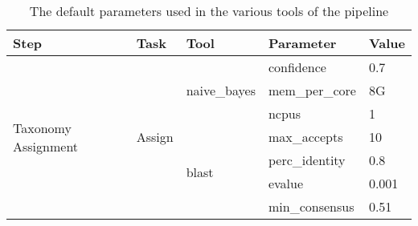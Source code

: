 \begin{table}[H]
\centering
\small
\begin{tabular}{lllll}
\hline
\textbf{Step}                             & \textbf{Task}                                            & \textbf{Tool}                          & \textbf{Parameter}                     & \textbf{Value}                                                                                           \\ \hline
\multirow{7}{*}{Taxonomy Assignment}      & \multirow{7}{*}{Assign}                                  & \multirow{3}{*}{naive\_bayes}          & confidence                             & 0.7                                                                                                      \\
                                          &                                                          &                                        & mem\_per\_core                         & 8G                                                                                                       \\
                                          &                                                          &                                        & ncpus                                  & 1                                                                                                        \\
                                          &                                                          & \multirow{4}{*}{blast}                 & max\_accepts                           & 10                                                                                                       \\
                                          &                                                          &                                        & perc\_identity                         & 0.8                                                                                                      \\
                                          &                                                          &                                        & evalue                                 & 0.001                                                                                                    \\
                                          &                                                          &                                        & min\_consensus                         & 0.51                                                                                                     \\ \hline
\end{tabular}
\caption{The default parameters used in the various tools of the pipeline}
\label{tab:all_parameters}
\end{table}


